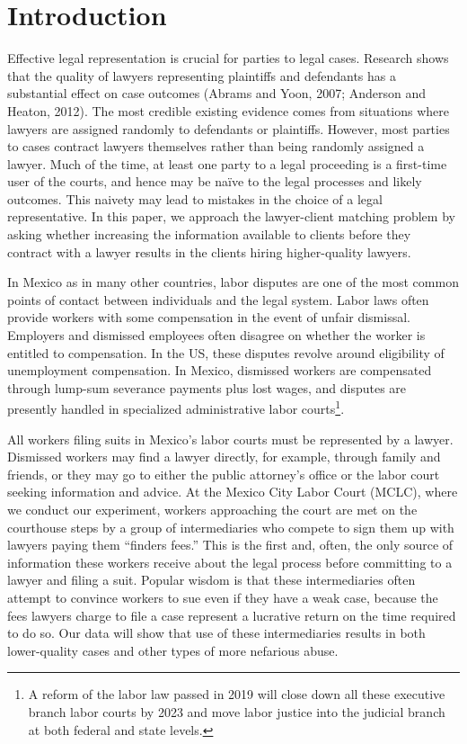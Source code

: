 \documentclass[12 pt]{article}
\begin{document}
\pagebreak \newpage




\doublespacing


\section{Introduction} \label{sec:introduction}
Effective legal representation is crucial for parties to legal cases. Research shows that the quality of lawyers representing plaintiffs and defendants has a substantial effect on case outcomes (Abrams and Yoon, 2007; Anderson and Heaton, 2012). The most credible existing evidence comes from situations where lawyers are assigned randomly to defendants or plaintiffs. However, most parties to cases contract lawyers themselves rather than being randomly assigned a lawyer. Much of the time, at least one party to a legal proceeding is a first-time user of the courts, and hence may be naïve to the legal processes and likely outcomes. This naivety may lead to mistakes in the choice of a legal representative. In this paper, we approach the lawyer-client matching problem by asking whether increasing the information available to clients before they contract with a lawyer results in the clients hiring higher-quality lawyers. 

In Mexico as in many other countries, labor disputes are one of the most common points of contact between individuals and the legal system. Labor laws often provide workers with some compensation in the event of unfair dismissal. Employers and dismissed employees often disagree on whether the worker is entitled to compensation. In the US, these disputes revolve around eligibility of unemployment compensation. In Mexico, dismissed workers are compensated through lump-sum severance payments plus lost wages, and disputes are presently handled in specialized administrative labor courts\footnote{A reform of the labor law passed in 2019 will close down all these executive branch labor courts by 2023 and move labor justice into the judicial branch at both federal and state levels.}. 

All workers filing suits in Mexico’s labor courts must be represented by a lawyer. Dismissed workers may find a lawyer directly, for example, through family and friends, or they may go to either the public attorney’s office or the labor court seeking information and advice. At the Mexico City Labor Court (MCLC), where we conduct our experiment, workers approaching the court are met on the courthouse steps by a group of intermediaries who compete to sign them up with lawyers paying them “finders fees.” This is the first and, often, the only source of information these workers receive about the legal process before committing to a lawyer and filing a suit. Popular wisdom is that these intermediaries often attempt to convince workers to sue even if they have a weak case, because the fees lawyers charge to file a case represent a lucrative return on the time required to do so. Our data will show that use of these intermediaries results in both lower-quality cases and other types of more nefarious abuse. 
\end{document}

